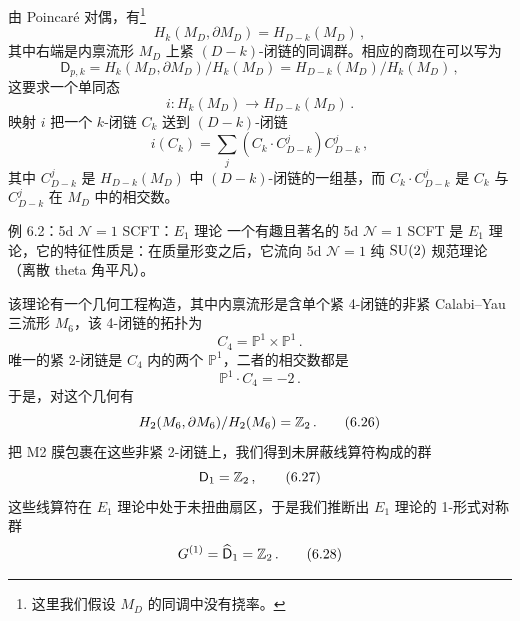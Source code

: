由 Poincaré 对偶，有\footnote{这里我们假设 $M_D$ 的同调中没有挠率。}
\begin{equation}
  H_k(M_D,\partial M_D) = H_{D-k}(M_D)\,, \tag{6.20}
\end{equation}
其中右端是内禀流形 $M_D$ 上紧 $(D-k)$-闭链的同调群。相应的商现在可以写为
\begin{equation}
  \mathsf{D}_{p,k} = H_k(M_D,\partial M_D)/H_k(M_D) = H_{D-k}(M_D)/H_k(M_D)\,, \tag{6.21}
\end{equation}
这要求一个单同态
\begin{equation}
  i : H_k(M_D) \to H_{D-k}(M_D)\,. \tag{6.22}
\end{equation}
映射 $i$ 把一个 $k$-闭链 $C_k$ 送到 $(D-k)$-闭链
\begin{equation}
  i(C_k) = \sum_j \left(C_k \cdot C^j_{D-k}\right) C^j_{D-k}\,, \tag{6.23}
\end{equation}
其中 $C^j_{D-k}$ 是 $H_{D-k}(M_D)$ 中 $(D-k)$-闭链的一组基，而 $C_k \cdot C^j_{D-k}$ 是 $C_k$ 与 $C^j_{D-k}$ 在 $M_D$ 中的相交数。

\begin{examplebox}{例 6.2：5d $\mathcal{N}=1$ SCFT：$E_1$ 理论}
一个有趣且著名的 5d $\mathcal{N}=1$ SCFT 是 $E_1$ 理论，它的特征性质是：在质量形变之后，它流向 5d $\mathcal{N}=1$ 纯 $\mathrm{SU}(2)$ 规范理论（离散 theta 角平凡）。

该理论有一个几何工程构造，其中内禀流形是含单个紧 4-闭链的非紧 Calabi--Yau 三流形 $M_6$，该 4-闭链的拓扑为
\begin{equation}
  C_4 = \mathbb{P}^1 \times \mathbb{P}^1\,. \tag{6.24}
\end{equation}
唯一的紧 2-闭链是 $C_4$ 内的两个 $\mathbb{P}^1$，二者的相交数都是
\begin{equation}
  \mathbb{P}^1 \cdot C_4 = -2\,. \tag{6.25}
\end{equation}
于是，对这个几何有
\begin{equation}
  H_2(M_6,\partial M_6)/H_2(M_6) = \mathbb{Z}_2\,. \tag{6.26}
\end{equation}
把 M2 膜包裹在这些非紧 2-闭链上，我们得到未屏蔽线算符构成的群
\begin{equation}
  \mathsf{D}_1 = \mathbb{Z}_2\,, \tag{6.27}
\end{equation}
这些线算符在 $E_1$ 理论中处于未扭曲扇区，于是我们推断出 $E_1$ 理论的 1-形式对称群
\begin{equation}
  G^{(1)} = \widehat{\mathsf{D}}_1 = \mathbb{Z}_2\,. \tag{6.28}
\end{equation}
\end{examplebox}

